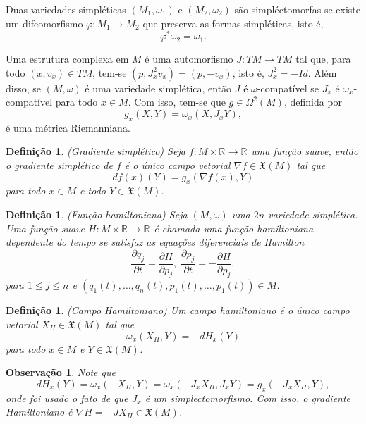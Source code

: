 \documentclass[12pt]{book}
\newtheorem{definicao}[teorema]{Definição}
\newtheorem{observacao}[teorema]{Observação}
\newcommand{\campossuaves}[1]{\mathfrak{X}(#1)}
\newcommand{\gradiente}{\nabla f}
\newcommand{\real}[1]{\mathbb{R}^{#1}}
\begin{document}
	Duas variedades simpléticas $(M_{1}, \omega_{1})$ e $(M_{2}, \omega_{2})$ são simpléctomorfas se existe um difeomorfismo $\varphi: M_{1}\to M_{2}$ que preserva as formas simpléticas, isto é,
	$$
	\varphi^{*}\omega_{2}=\omega_{1}.
	$$
	
	Uma estrutura complexa em $M$ é uma automorfismo $J:TM \to TM$ tal que, para todo $(x,v_{x})\in TM$, tem-se $(p, J^{2}_{x}v_{x}) = (p, -v_{x})$, isto é, $J^{2}_{x}=-Id$. Além disso, se $(M, \omega)$ é uma variedade simplética, então $J$ é $\omega$-compatível se $J_{x}$ é $\omega_{x}$-compatível para todo $x\in M$. Com isso, tem-se que $g \in \Omega^{2}(M)$, definida por
	$$
	g_{x}(X, Y) =\omega_{x}(X, J_{x}Y),
	$$
	é uma métrica Riemanniana.
	
	\begin{definicao}
		(Gradiente simplético) Seja $f : M \times \real{} \to \real{}$ uma função suave, então o gradiente simplético de $f$ é o único campo vetorial $\gradiente \in \mathfrak{X}(M)$ tal que 
		$$
		df(x)(Y) = g_{x}(\gradiente(x),Y)
		$$ 
		para todo $x \in M$ e todo $Y \in \mathfrak{X}(M)$.
	\end{definicao}
	
	\begin{definicao}
		(Função hamiltoniana) Seja $(M, \omega)$ uma $2n$-variedade simplética. Uma função suave $H : M \times \real{} \to \real{}$ é chamada uma função hamiltoniana dependente do tempo se satisfaz as equações diferenciais de Hamilton
		$$
		\frac{\partial q_{j}}{\partial t} = \frac{\partial H}{\partial p_{j}}, \; \frac{\partial p_{j}}{\partial t} = -\frac{\partial H}{\partial p_{j}},
		$$
		para $1\leq j \leq n$ e $(q_{1}(t), \dots, q_{n}(t), p_{1}(t), \dots, p_{1}(t)) \in M$.
	\end{definicao}
	
	\begin{definicao}
		(Campo Hamiltoniano) Um campo hamiltoniano é o único campo vetorial $X_{H}\in \campossuaves{M}$ tal que
		$$
		\omega_{x}(X_{H}, Y) = -dH_{x}(Y)
		$$
		para todo $x\in M$ e $Y \in \campossuaves{M}$.
	\end{definicao}
	
	\begin{observacao}
		Note que 
		$$
		dH_{x}(Y)=\omega_{x}(-X_{H}, Y) =\omega_{x}(-J_{x}X_{H}, J_{x}Y) =g_{x}(-J_{x}X_{H}, Y),$$
		onde foi usado o fato de que $J_{x}$ é um simplectomorfismo. Com isso, o gradiente Hamiltoniano é $\nabla H = -JX_{H} \in \campossuaves{M}$.
	\end{observacao}
	
\end{document}
